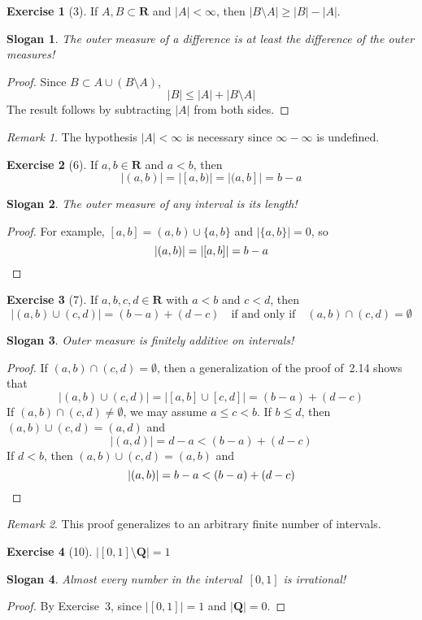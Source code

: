 \documentclass[letterpaper,12pt]{article}
\newcommand{\Q}{\mathbf{Q}}
\newcommand{\R}{\mathbf{R}}
\newcommand{\union}{\cup}
\newcommand{\sect}{\cap}
\newcommand{\m}[1]{|#1|}
\theoremstyle{definition}
\newtheorem*{exer}{Exercise}
\theoremstyle{remark}
\newtheorem*{rmk}{Remark}
\theoremstyle{plain}
\newtheorem*{slogan}{Slogan}
\begin{document}
\begin{exer}[3]
If \(A,B\subset\R\) and \(\m{A}<\infty\), then \(\m{B\setminus A}\ge\m{B}-\m{A}\).
\end{exer}
\begin{slogan}
The outer measure of a difference is at least the difference of the outer measures!
\end{slogan}
\begin{proof}
Since \(B\subset A\union(B\setminus A)\),
\[\m{B}\le\m{A}+\m{B\setminus A}\]
The result follows by subtracting \(\m{A}\) from both sides.
\end{proof}
\begin{rmk}
The hypothesis \(\m{A}<\infty\) is necessary since \(\infty-\infty\) is undefined.
\end{rmk}

\begin{exer}[6]
If \(a,b\in\R\) and \(a<b\), then
\[\m{(a,b)}=\m{[a,b)}=\m{(a,b]}=b-a\]
\end{exer}
\begin{slogan}
The outer measure of any interval is its length!
\end{slogan}
\begin{proof}
For example, \([a,b]=(a,b)\union\{a,b\}\) and \(\m{\{a,b\}}=0\), so
\[\m{(a,b)}=\m{[a,b]}=b-a\qedhere\]
\end{proof}

\begin{exer}[7]
If \(a,b,c,d\in\R\) with \(a<b\) and \(c<d\), then
\[\m{(a,b)\union(c,d)}=(b-a)+(d-c)\quad\text{if and only if}\quad(a,b)\sect(c,d)=\emptyset\]
\end{exer}
\begin{slogan}
Outer measure is finitely additive on intervals!
\end{slogan}
\begin{proof}
If \((a,b)\sect(c,d)=\emptyset\), then a generalization of the proof of~2.14 shows that
\[\m{(a,b)\union(c,d)}=\m{[a,b]\union[c,d]}=(b-a)+(d-c)\]
If \((a,b)\sect(c,d)\ne\emptyset\), we may assume \(a\le c<b\). If \(b\le d\), then \((a,b)\union(c,d)=(a,d)\) and
\[\m{(a,d)}=d-a<(b-a)+(d-c)\]
If \(d<b\), then \((a,b)\union(c,d)=(a,b)\) and
\[\m{(a,b)}=b-a<(b-a)+(d-c)\qedhere\]
\end{proof}
\begin{rmk}
This proof generalizes to an arbitrary finite number of intervals.
\end{rmk}

\begin{exer}[10]
\(\m{[0,1]\setminus\Q}=1\)
\begin{slogan}
Almost every number in the interval~\([0,1]\) is irrational!
\end{slogan}
\end{exer}
\begin{proof}
By Exercise~3, since \(\m{[0,1]}=1\) and \(\m{\Q}=0\).
\end{proof}
\end{document}

